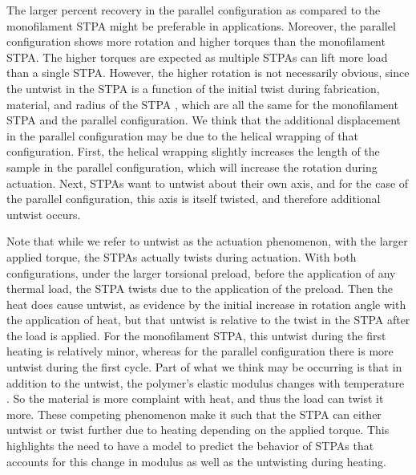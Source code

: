 \documentclass[twocolumn,10pt]{asme2e}
\begin{document}
The larger percent recovery in the parallel configuration as compared to the monofilament STPA might be preferable in applications.  %
Moreover, the parallel configuration shows more rotation and higher torques than the monofilament STPA.  The higher torques are expected as multiple STPAs can lift more load than a single STPA.  However, the higher rotation is not necessarily obvious, since the untwist in the STPA is a function of the initial twist during fabrication, material, and radius of the STPA \cite{Aziz_Controlled}, which are all the same for the monofilament STPA and the parallel configuration. 
We think that the additional displacement in the parallel configuration may be due to the helical wrapping of that configuration.  First, the helical wrapping slightly increases the length of the sample in the parallel configuration, which will increase the rotation during actuation.  Next, STPAs want to untwist about their own axis, and for the case of the parallel configuration, this axis is itself twisted, and therefore additional untwist occurs.   

Note that while we refer to untwist as the actuation phenomenon, with the larger applied torque, the STPAs actually twists during actuation.  With both configurations, under the larger torsional preload, before the application of any thermal load, the STPA twists due to the application of the preload.  Then the heat does cause untwist, as evidence by the initial increase in rotation angle with the application of heat, but that untwist is relative to the twist in the STPA after the load is applied.  
For the monofilament STPA, this untwist during the first heating is relatively minor, whereas for the parallel configuration there is more untwist during the first cycle.  Part of what we think may be occurring is that in addition to the untwist, the polymer's elastic modulus changes with temperature \cite{Shafer_first}.  So the material is more complaint with heat,  and thus the load can twist it more.   These competing phenomenon make it such that the STPA can either untwist or twist further due to heating depending on the applied torque.  
This highlights the need to have a model to predict the behavior of STPAs that accounts for this change in modulus as well as the untwisting during heating.  
\end{document}

